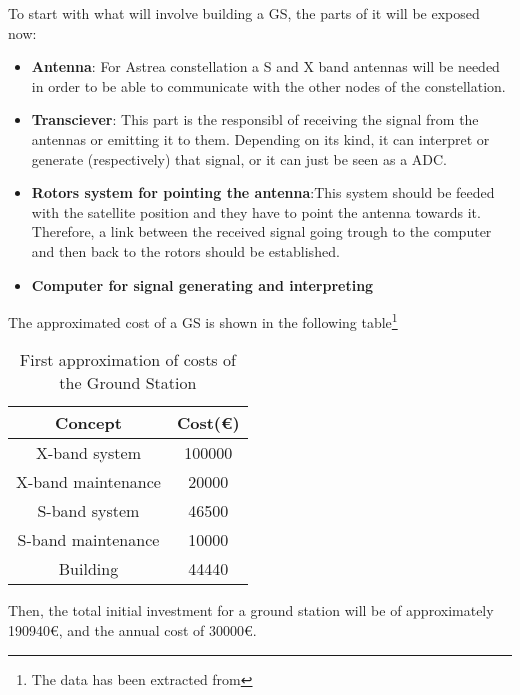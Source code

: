 To start with what will involve building a GS, the parts of it will be exposed now:
\begin{itemize}
\item \textbf{Antenna}: For Astrea constellation a S and X band antennas will be needed in order to be able to communicate with the other nodes of the constellation.
\item \textbf{Transciever}: This part is the responsibl of receiving the signal from the antennas or emitting it to them. Depending on its kind, it can interpret or generate (respectively) that signal, or it can just be seen as a ADC. \item \textbf{Rotors system for pointing the antenna}:This system should be feeded with the satellite position and they have to point the antenna towards it. Therefore, a link between the received signal going trough to the computer and then back to the rotors should be established. 
\item \textbf{Computer for signal generating and interpreting}
\end{itemize}

The approximated cost of a GS is shown in the following table\footnote{The data has been extracted from\cite{XBand}\cite{SBand} }

\begin{table}[H]
\begin{center}
\begin{tabular}{|c|c|}
\hline
\textbf{Concept}&\textbf{Cost(\euro)}\\
\hline
X-band system&100000\\
\hline
X-band maintenance&20000\\
\hline
S-band system&46500\\
\hline
S-band maintenance&10000\\
\hline
Building&44440\\
\hline
\end{tabular}
\caption[Aproximation of costs of a Ground Station]{First approximation of costs of the Ground Station}
\end{center}
\end{table}

Then, the total initial investment for a ground station will be of approximately 190940\euro, and the annual cost of 30000\euro.